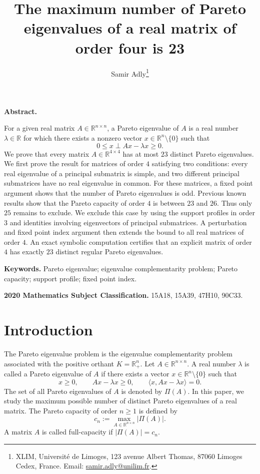 \documentclass[11pt,a4paper]{article}
\title{The maximum number of Pareto eigenvalues of a real matrix of order four is 23}
\author{Samir Adly\thanks{XLIM, Universit\'e de Limoges,
123 avenue Albert Thomas, 87060 Limoges Cedex, France.
Email: \href{mailto:samir.adly@unilim.fr}{samir.adly@unilim.fr}.}}
\date{}
\theoremstyle{definition}
\newcommand{\R}{\mathbb R}
\renewenvironment{abstract}
  {%
    \par\smallskip
    \small
    \noindent\textbf{Abstract. }\ignorespaces
  }
  {%
    \par\medskip
  }
\begin{document}
\maketitle

\begin{abstract}
For a given real matrix $A\in\R^{n\times n}$, a Pareto eigenvalue of $A$ is a real number $\lambda\in\R$ for which there exists a nonzero vector $x\in\R^n\setminus\{0\}$ such that
$$
0\leq x\perp Ax-\lambda x\geq0.
$$
We prove that every matrix $A\in\R^{4\times4}$ has at most $23$ distinct Pareto eigenvalues. We first prove the result for matrices of order $4$ satisfying two conditions: every real eigenvalue of a principal submatrix is simple, and two different principal submatrices have no real eigenvalue in common. For these matrices, a fixed point argument shows that the number of Pareto eigenvalues is odd. Previous known results show that the Pareto capacity of order $4$ is between $23$ and $26$. Thus only $25$ remains to exclude. We exclude this case by using the support profiles in order $3$ and identities involving eigenvectors of principal submatrices. A perturbation and fixed point index argument then extends the bound to all real matrices of order $4$. An exact symbolic computation certifies that an explicit matrix of order $4$ has exactly $23$ distinct regular Pareto eigenvalues.
\end{abstract}

\noindent\textbf{Keywords.}
Pareto eigenvalue; eigenvalue complementarity problem; Pareto capacity;
support profile; fixed point index.

\medskip
\noindent\textbf{2020 Mathematics Subject Classification.}
15A18, 15A39, 47H10, 90C33.

\section{Introduction}
\label{sec:introduction}

The Pareto eigenvalue problem is the eigenvalue complementarity problem associated with the positive orthant $K=\R_+^n$. Let $A\in\R^{n\times n}$. A real number $\lambda$ is called a Pareto eigenvalue of $A$ if there exists a vector $x\in\R^n\setminus\{0\}$ such that
$$
x\geq0,
\qquad
Ax-\lambda x\geq0,
\qquad
\langle x,Ax-\lambda x\rangle=0.
$$
The set of all Pareto eigenvalues of $A$ is denoted by $\Pi(A)$. In this paper, we study the maximum possible number of distinct Pareto eigenvalues of a real matrix. The Pareto capacity of order $n\geq1$ is defined by
$$
c_n:=\max_{A\in\R^{n\times n}}|\Pi(A)|.
$$
A matrix $A$ is called full-capacity if $|\Pi(A)|=c_n$.
\end{document}

